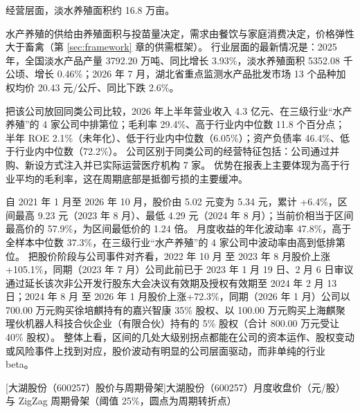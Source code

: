  经营层面，淡水养殖面积约 16.8 万亩。

 水产养殖的供给由养殖面积与投苗量决定，需求由餐饮与家庭消费决定，价格弹性大于畜禽（第 \ref{sec:framework} 章的供需框架）。 行业层面的最新情况是：2025 年，全国淡水产品产量 3792.20 万吨、同比增长 3.93\%，淡水养殖面积 5352.08 千公顷、增长 0.46\%；2026 年 7 月，湖北省重点监测水产品批发市场 13 个品种加权均价 20.43 元/公斤、同比下跌 2.6\%。

 把该公司放回同类公司比较，2026 年上半年营业收入 4.3 亿元、在三级行业“水产养殖”的 4 家公司中排第位；毛利率 29.4\%、高于行业内中位数 11.8 个百分点；半年 ROE 2.1\%（未年化）、低于行业内中位数（6.05\%）；资产负债率 46.4\%、低于行业内中位数（72.2\%）。 公司区别于同类公司的经营特征包括：公司通过并购、新设方式注入并已实际运营医疗机构 7 家。 优势在报表上主要体现为高于行业平均的毛利率，这在周期底部是抵御亏损的主要缓冲。

 自 2021 年 1 月至 2026 年 10 月，股价由 5.02 元变为 5.34 元，累计 +6.4\%，区间最高 9.23 元（2023 年 8 月）、最低 4.29 元（2024 年 8 月）；当前价相当于区间最高价的 57.9\%，为区间最低价的 1.24 倍。 月度收益的年化波动率 47.8\%，高于全样本中位数 37.3\%，在三级行业“水产养殖”的 4 家公司中波动率由高到低排第位。 把股价阶段与公司事件对齐看，2022 年 10 月 至 2023 年 8 月股价上涨+105.1\%，同期（2023 年 7 月）公司此前已于 2023 年 1 月 19 日、2 月 6 日审议通过延长该次非公开发行股东大会决议有效期及授权有效期至 2024 年 2 月 13 日；2024 年 8 月 至 2026 年 1 月股价上涨+72.3\%，同期（2026 年 1 月）公司以 700.00 万元购买徐培麒持有的嘉兴智康 35\% 股权、以 100.00 万元购买上海麒聚瑆伙机器人科技合伙企业（有限合伙）持有的 5\% 股权（合计 800.00 万元受让 40\% 股权）。 整体上看，区间的几处大级别拐点都能在公司的资本运作、股权变动或风险事件上找到对应，股价波动有明显的公司层面驱动，而非单纯的行业 beta。

\begin{center}
\begin{minipage}{\textwidth}\centering
{}

[大湖股份（600257）股价与周期骨架]{大湖股份（600257）月度收盘价（元/股）与 ZigZag 周期骨架（阈值 25\%，圆点为周期转折点）}
\end{minipage}
\end{center}


